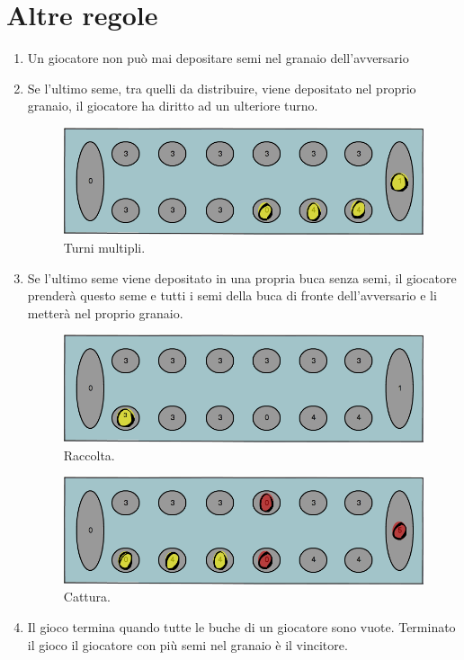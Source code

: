 \documentclass[paper=a4, fontsize=11pt]{scrartcl}	%
\numberwithin{equation}{section}															%
\numberwithin{figure}{section}																%
\numberwithin{table}{section}																%
\begin{document}
\section{Altre regole}
\begin{enumerate}
	\item Un giocatore non pu\`o mai depositare semi nel granaio dell'avversario
	\item Se l'ultimo seme, tra quelli da distribuire, viene depositato nel proprio granaio, il giocatore ha diritto ad un ulteriore turno.

\begin{figure}[h]
\centering
        \includegraphics[totalheight=3.5cm]{Bantumi_4.png}
    \caption{Turni multipli.}
    \label{fig:verticalcell}
\end{figure}
	\item Se l'ultimo seme viene depositato in una propria buca senza semi, il giocatore prender\`a questo seme e tutti i semi della buca di fronte dell'avversario e li metter\`a nel proprio granaio.

\begin{figure}[h]
\centering
        \includegraphics[totalheight=3.5cm]{Bantumi_2.png}
    \caption{Raccolta.}
    \label{fig:verticalcell}
\end{figure}
\begin{figure}[h]
\centering
        \includegraphics[totalheight=3.5cm]{Bantumi2.png}
    \caption{Cattura.}
    \label{fig:verticalcell}
\end{figure}

	\item Il gioco termina quando tutte le buche di un giocatore sono vuote. Terminato il gioco il giocatore con pi\`u semi nel granaio \`e il vincitore.
\end{enumerate}
\end{document}
